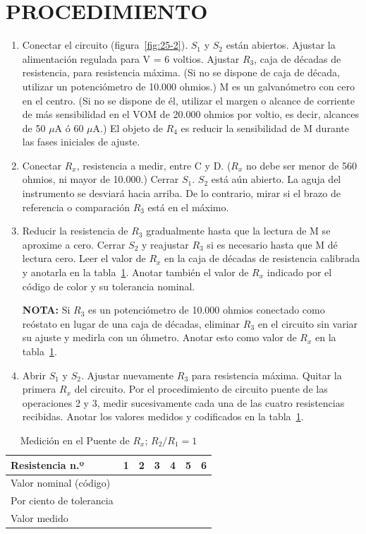 \documentclass{article}
\numberwithin{equation}{subsection}
\numberwithin{figure}{section}
\numberwithin{table}{section}
\begin{document}
\section{PROCEDIMIENTO}
\begin{enumerate}
    \item Conectar el circuito (figura~\ref{fig:25-2}). $S_1$ y $S_2$ están abiertos. Ajustar la alimentación regulada para 
    V = 6 voltios. Ajustar $R_3$, caja de décadas de resistencia, para resistencia máxima. (Si no se dispone de 
    caja de década, utilizar un potenciómetro de 10.000 ohmios.) M es un galvanómetro con cero en el centro. 
    (Si no se dispone de él, utilizar el margen o alcance de corriente de más sensibilidad en el VOM de 20.000 
    ohmios por voltio, es decir, alcances de 50 $\mu$A ó 60 $\mu$A.) El objeto de $R_4$ es reducir la sensibilidad 
    de M durante las fases iniciales de ajuste.
    \item Conectar $R_x$, resistencia a medir, entre C y D. ($R_x$ no debe ser menor de 560 ohmios, ni mayor de 10.000.) 
    Cerrar $S_1$. $S_2$ está aún abierto. La aguja del instrumento se desviará hacia arriba. De lo contrario, mirar si 
    el brazo de referencia o comparación $R_3$ está en el máximo.
    \item Reducir la resistencia de $R_3$ gradualmente hasta que la lectura de M se aproxime a cero. Cerrar $S_2$ y 
    reajustar $R_3$ si es necesario hasta que M dé lectura cero. Leer el valor de $R_x$ en la caja de décadas de 
    resistencia calibrada y anotarla en la tabla~\ref{tab:25-1}. Anotar también el valor de $R_x$ indicado por el código de color 
    y su tolerancia nominal.
    
    \textbf{NOTA:} Si $R_3$ es un potenciómetro de 10.000 ohmios conectado como reóstato en lugar de una caja de 
    décadas, eliminar $R_3$ en el circuito sin variar su ajuste y medirla con un óhmetro. Anotar esto como valor 
    de $R_x$ en la tabla~\ref{tab:25-1}.
    
    \item Abrir $S_1$ y $S_2$. Ajustar nuevamente $R_3$ para resistencia máxima. Quitar la primera $R_x$ del circuito. 
    Por el procedimiento de circuito puente de las operaciones 2 y 3, medir sucesivamente cada una de las cuatro 
    resistencias recibidas. Anotar los valores medidos y codificados en la tabla~\ref{tab:25-1}.
\end{enumerate}

\begin{table}[!htbp]
    \centering
    \caption{Medición en el Puente de $R_x$; $R_2/R_1 = 1$}
    \label{tab:25-1}
    \begin{tabular}{|l|c|c|c|c|c|c|}
        \hline
        \textbf{Resistencia n.º} & \textbf{1} & \textbf{2} & \textbf{3} & \textbf{4} & \textbf{5} & \textbf{6} \\ \hline
        Valor nominal (código) & & & & & & \\ \hline
        Por ciento de tolerancia & & & & & & \\ \hline
        Valor medido & & & & & & \\ \hline
    \end{tabular}
\end{table}
\end{document}

